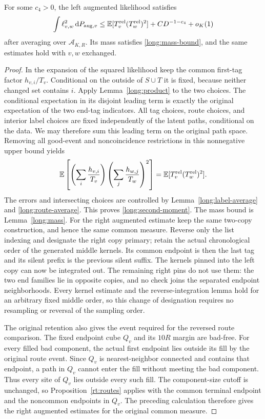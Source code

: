 \begin{proposition}\label{long:augmented-moments}
For some $c_4>0$, the left augmented likelihood satisfies
\begin{equation}\label{long:second-moment}
 \int\ell_{v,w}^2\,\mathrm d P_{{\rm aug},v}
       \le \mathbb E[T_v^{\rm rel}(T_w^{\rm rel})^2]
                           +CD^{-1-c_4}+o_K(1)
\end{equation}
after averaging over $\mathcal A_{K,R}$.  Its mass satisfies
\eqref{long:mass-bound}, and the same estimates hold with $v,w$ exchanged.
\end{proposition}
\begin{proof}
In the expansion of the squared likelihood keep the common first-tag
factor $h_{v,i}/T_v$.  Conditional on the outside of $S\cup T$ it is
fixed, because neither changed set contains $i$.  Apply
Lemma~\ref{long:product} to the two choices.  The conditional expectation
in its disjoint leading term is exactly the original expectation of the
two end-tag indicators.  All tag choices, route choices, and interior
label choices are fixed independently of the latent paths, conditional
on the data.  We may therefore sum this leading term on the original
path space.  Removing all good-event and noncoincidence restrictions in
this nonnegative upper bound yields
\[
 \mathbb E\left[
    \left(\sum_i\frac{h_{v,i}}{T_v}\right)
    \left(\sum_j\frac{h_{w,j}}{T_w}\right)^2\right]
             =\mathbb E[T_v^{\rm rel}(T_w^{\rm rel})^2].
\]
The errors and intersecting choices are controlled by
Lemma~\ref{long:label-average} and \eqref{long:route-average}.  This
proves \eqref{long:second-moment}.  The mass bound is
Lemma~\ref{long:mass}.  For the right augmented estimate keep the same
two-copy construction, and hence the same common measure.  Reverse only
the list indexing and designate the right copy primary; retain the actual
chronological order of the generated middle kernels.  Its common endpoint
is then the last tag and its silent prefix is the previous silent suffix.
The kernels pinned into the left copy can now be integrated out.  The
remaining right pins do not use them: the two end families lie in opposite
copies, and no check joins the separated endpoint neighborhoods.  Every
kernel estimate and the reverse-integration lemma hold for an arbitrary
fixed middle order, so this change of designation requires no resampling
or reversal of the sampling order.

The original retention also gives the event required for the reversed
route comparison.  The fixed endpoint cube $Q_v$ and its $10R$ margin
are bad-free.  For every filled bad component, the actual first endpoint
lies outside its fill by the original route event.  Since $Q_v$ is
nearest-neighbor connected and contains that endpoint, a path in $Q_v$
cannot enter the fill without meeting the bad component.  Thus every site
of $Q_v$ lies outside every such fill.  The component-size cutoff is
unchanged, so Proposition~\ref{rt:routes} applies with the common terminal
endpoint and the noncommon endpoints in $Q_v$.
The preceding calculation therefore gives the right augmented estimates
for the original common measure.
\end{proof}

